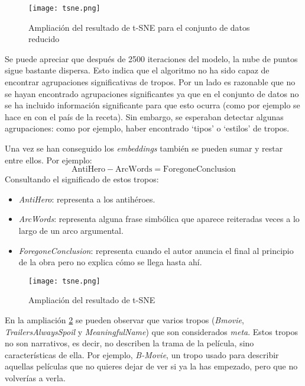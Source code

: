 \begin{figure}\label{tsne}
  \texttt{[image: tsne.png]}
  \centering
  \caption{Ampliación del resultado de t-SNE para el conjunto de datos reducido}
\end{figure}

Se puede apreciar que después de 2500 iteraciones del modelo, la nube de puntos sigue bastante dispersa. Esto indica que el algoritmo no ha sido capaz de encontrar
agrupaciones significativas de tropos. Por un lado es razonable que no se hayan encontrado agrupaciones significantes ya que en el conjunto de datos no se ha incluido
información significante para que esto ocurra (como por ejemplo se hace en \cite{kazama2018neural} con el país de la receta). Sin embargo, se esperaban detectar algunas
agrupaciones: como por ejemplo, haber encontrado `tipos' o `estilos' de tropos.

Una vez se han conseguido los \textit{embeddings} también se pueden sumar y restar entre ellos. Por ejemplo:
\begin{equation}
  \text{AntiHero} - \text{ArcWords} = \text{ForegoneConclusion}
\end{equation}
Consultando el significado de estos tropos:
\begin{itemize}
  \item \textit{AntiHero}: representa a los antihéroes.
  \item \textit{ArcWords}: representa alguna frase simbólica que aparece reiteradas veces a lo largo de un arco argumental.
  \item \textit{ForegoneConclusion}: representa cuando el autor anuncia el final al principio de la obra pero no explica cómo se llega hasta ahí.
\end{itemize}

\begin{figure}\label{ampliacion_meta}
  \texttt{[image: tsne.png]}
  \centering
  \caption{Ampliación del resultado de t-SNE}
\end{figure}

En la ampliación \ref{ampliacion_meta} se pueden observar que varios tropos (\textit{Bmovie}, \textit{TrailersAlwaysSpoil} y \textit{MeaningfulName}) que son considerados \textit{meta}. Estos tropos no son narrativos,
es decir, no describen la trama de la película, sino características de ella. Por ejemplo, \textit{B-Movie}, un tropo usado para describir aquellas películas que no quieres dejar de ver
si ya la has empezado, pero que no volverías a verla.

